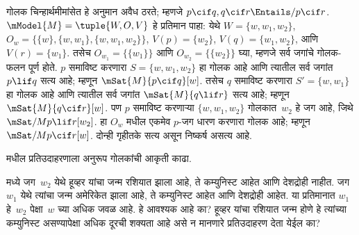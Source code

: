 \documentclass[../../../include/open-logic-section]{subfiles}
\begin{document}
\begin{ex}
  गोलक चिन्हार्थमीमांसेत हे
  अनुमान अवैध ठरते;
  म्हणजे
  $p \cif q, q \cif r
  \Entails/ p \cif r$.
  $\mModel{M} = \tuple{W, O, V}$
  हे प्रतिमान पाहा: येथे
  $W = \{w, w_1, w_2\}$,
  $O_w = \{\{w\}, \{w,
  w_1\}, \{w, w_1, w_2\}\}$,
  $V(p) = \{w_2\}$,
  $V(q) = \{w_1, w_2\}$,
  आणि $V(r) = \{w_1\}$.
  तसेच $O_{w_1}=\{\{w_1\}\}$ आणि $O_{w_2}=\{\{w_2\}\}$
  घ्या, म्हणजे सर्व जगांचे गोलक-फलन पूर्ण होते.
  $p$ समाविष्ट करणारा
  $S = \{w, w_1, w_2\}$
  हा गोलक आहे आणि
  त्यातील सर्व जगांत
  $p \lif q$ सत्य आहे;
  म्हणून
  $\mSat{M}{p \cif q}[w]$.
  तसेच $q$ समाविष्ट
  करणारा
  $S' = \{w, w_1\}$
  हा गोलक आहे आणि
  त्यातील सर्व जगांत
  $\mSat{M}{q \lif r}$
  सत्य आहे; म्हणून
  $\mSat{M}{q \cif r}[w]$.
  पण $p$ समाविष्ट
  करणाऱ्या
  $\{w, w_1, w_2\}$
  गोलकात~$w_2$
  हे जग आहे,
  जिथे
  $\mSat/{M}{p \lif
    r}[w_2]$. हा $O_w$ मधील एकमेव $p$-जग धारण करणारा
  गोलक आहे; म्हणून $\mSat/{M}{p\cif r}[w]$.
  दोन्ही गृहीतके सत्य असून निष्कर्ष असत्य आहे.
\end{ex}

\begin{prob}
  मधील प्रतिउदाहरणाला
  अनुरूप गोलकांची
  आकृती काढा.
\end{prob}

\begin{prob}
  मध्ये जग~$w_2$
  येथे हूव्हर यांचा
  जन्म रशियात झाला
  आहे, ते कम्युनिस्ट
  आहेत आणि देशद्रोही
  नाहीत. जग~$w_1$
  येथे त्यांचा जन्म
  अमेरिकेत झाला
  आहे, ते कम्युनिस्ट
  आहेत आणि देशद्रोही
  आहेत. या प्रतिमानात
  $w_1$ हे~$w_2$
  पेक्षा~$w$ च्या
  अधिक जवळ आहे.
  हे आवश्यक आहे
  का? हूव्हर यांचा
  रशियात जन्म होणे
  हे त्यांच्या
  कम्युनिस्ट असण्यापेक्षा
  अधिक दूरची
  शक्यता आहे असे
  न मानणारे
  प्रतिउदाहरण
  देता येईल का?
\end{prob}
\end{document}
